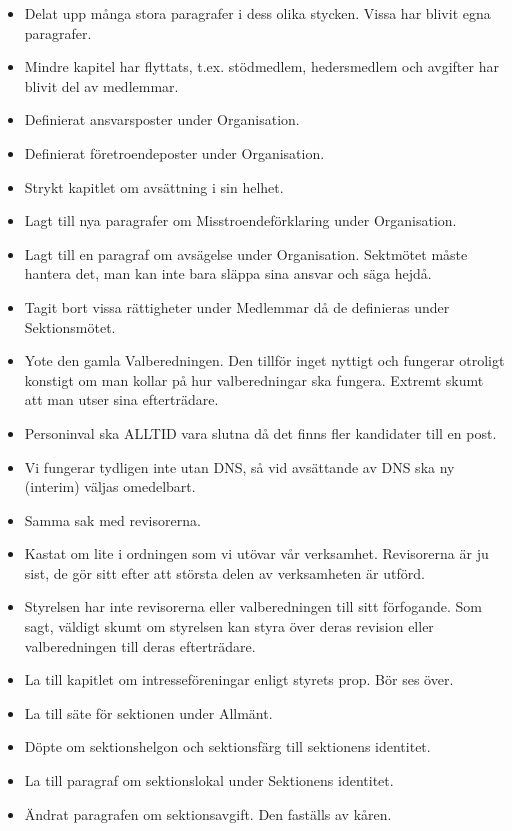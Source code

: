 \documentclass[a4paper]{dtek}
\begin{document}
\begin{itemize}
  \item Delat upp många stora paragrafer i dess olika stycken. Vissa har blivit egna paragrafer.
  \item Mindre kapitel har flyttats, t.ex. stödmedlem, hedersmedlem och avgifter har blivit del av medlemmar.
  \item Definierat ansvarsposter under Organisation.
  \item Definierat företroendeposter under Organisation.
  \item Strykt kapitlet om avsättning i sin helhet.
  \item Lagt till nya paragrafer om Misstroendeförklaring under Organisation.
  \item Lagt till en paragraf om avsägelse under Organisation. Sektmötet måste hantera det, man kan inte bara släppa sina ansvar och säga hejdå.
  \item Tagit bort vissa rättigheter under Medlemmar då de definieras under Sektionsmötet.
  \item Yote den gamla Valberedningen. Den tillför inget nyttigt och fungerar otroligt konstigt om man kollar på hur valberedningar ska fungera. Extremt skumt att man utser sina efterträdare.
  \item Personinval ska ALLTID vara slutna då det finns fler kandidater till en post.
  \item Vi fungerar tydligen inte utan DNS, så vid avsättande av DNS ska ny (interim) väljas omedelbart.
  \item Samma sak med revisorerna.
  \item Kastat om lite i ordningen som vi utövar vår verksamhet. Revisorerna är ju sist, de gör sitt efter att största delen av verksamheten är utförd.
  \item Styrelsen har inte revisorerna eller valberedningen till sitt förfogande. Som sagt, väldigt skumt om styrelsen kan styra över deras revision eller valberedningen till deras efterträdare.
  \item La till kapitlet om intresseföreningar enligt styrets prop. Bör ses över.
  \item La till säte för sektionen under Allmänt.
  \item Döpte om sektionshelgon och sektionsfärg till sektionens identitet.
  \item La till paragraf om sektionslokal under Sektionens identitet.
  \item Ändrat paragrafen om sektionsavgift. Den faställs av kåren.
\end{itemize}
\end{document}
